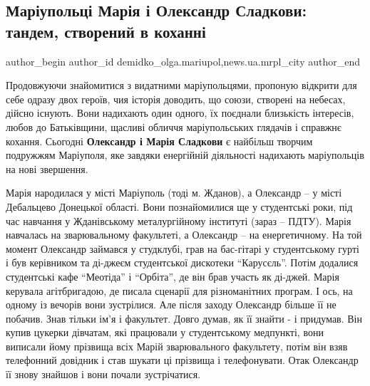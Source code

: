  
 
 
 
 
 
\subsection{Маріупольці Марія і Олександр Сладкови: тандем, створений в коханні}
\label{sec:22_04_2019.stz.news.ua.mrpl_city.1.sladkovy_tandem_kohannja}
 
\ifcmt
 author_begin
   author_id demidko_olga.mariupol,news.ua.mrpl_city
 author_end
\fi


Продовжуючи знайомитися з видатними маріупольцями, пропоную відкрити для себе
одразу двох героїв, чия історія доводить, що союзи, створені на небесах, дійсно
існують. Вони надихають один одного, їх поєднали близькість інтересів, любов до
Батьківщини, щасливі обличчя маріупольських глядачів і справжнє кохання.
Сьогодні \textbf{Олександр і Марія Сладкови} є найбільш творчим подружжям Маріуполя, яке
завдяки енергійній діяльності надихають маріупольців на нові звершення.


Марія народилася у місті Маріуполь (тоді м. Жданов), а Олександр – у місті
Дебальцево Донецької області. Вони познайомилися ще у студентські роки, під час
навчання у Жданівському металургійному інституті (зараз – ПДТУ). Марія
навчалась на зварювальному факультеті, а Олександр – на енергетичному. На той
момент Олександр займався у студклубі, грав на бас-гітарі у студентському гурті
і був керівником та ді-джеєм студентської дискотеки \enquote{Карусєль}. Потім додалися
студентські кафе \enquote{Меотіда} і \enquote{Орбіта}, де він брав участь як ді-джей. Марія
керувала агітбригадою, де писала сценарії для різноманітних програм. І ось, на
одному із вечорів вони зустрілися. Але після заходу Олександр більше її не
побачив. Знав тільки ім'я і факультет. Довго думав, як її знайти - і придумав.
Він купив цукерки дівчатам, які працювали у студентському медпункті, вони
виписали йому прізвища всіх Марій зварювального факультету, потім він взяв
телефонний довідник і став шукати ці прізвища і телефонувати. Отак Олександр її
знову знайшов і вони почали зустрічатися.

